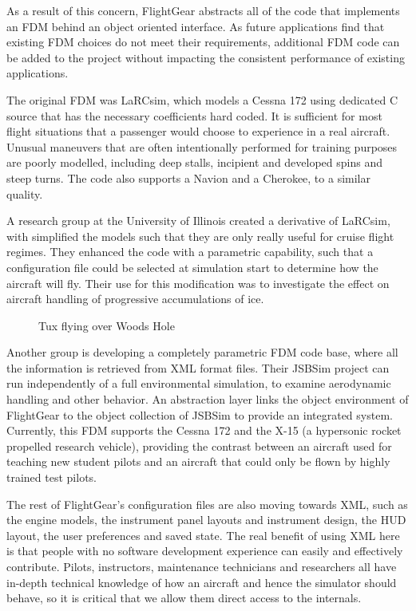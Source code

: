 \documentclass[a4paper,10pt]{article}
\begin{document}
As a result of this concern, FlightGear abstracts all of the
code that implements an FDM behind an object oriented interface.
As future applications find that existing FDM choices do not meet
their requirements, additional FDM code can be added to the project
without impacting the consistent performance of existing applications.

The original FDM was LaRCsim, which models a Cessna 172 using
dedicated C source that has the necessary coefficients hard coded.
It is sufficient for most flight situations that a passenger would choose
to experience in a real aircraft.  Unusual maneuvers that are often
intentionally performed for training purposes are poorly modelled,
including deep stalls, incipient and developed spins and steep turns.
The code also supports a Navion and a Cherokee, to a similar quality.

A research group at the University of Illinois created a derivative
of LaRCsim, with simplified the models such that they are only
really useful for cruise flight regimes.  They enhanced the code with
a parametric capability, such that a configuration file could be
selected at simulation start to determine how the aircraft will fly.
Their use for this modification was to investigate the effect on
aircraft handling of progressive accumulations of ice.
%
\begin{figure}
\begin{center}\end{center}
\caption{Tux flying over Woods Hole}
\label{fig:wh-tux}
\end{figure}

Another group is developing a completely parametric FDM code base,
where all the information is retrieved from XML format files.
Their JSBSim project\cite{jsbsim}
can run independently of a full environmental
simulation, to examine aerodynamic handling and other behavior.
An abstraction layer links the object environment of FlightGear
to the object collection of JSBSim to provide an integrated system.
Currently, this FDM supports the Cessna 172 and the X-15 (a hypersonic
rocket propelled research vehicle), providing the contrast between an
aircraft used for teaching new student pilots and an aircraft that
could only be flown by highly trained test pilots.


The rest of FlightGear's configuration files are also moving towards
XML, such as the engine models,
the instrument panel layouts and instrument design, the HUD layout,
the user preferences and saved state.
The real benefit of using XML here is that people with no software
development experience can easily and effectively contribute.
Pilots, instructors, maintenance technicians and researchers all have
in-depth technical knowledge of how 
an aircraft and hence the simulator should behave,
so it is critical that we allow them direct access to the internals.
\end{document}
